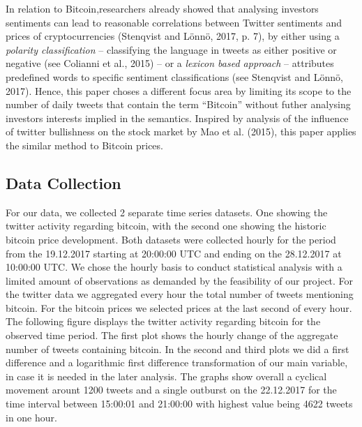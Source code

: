 \documentclass[a4paper,american,12pt]{article}
\begin{document}
\begin{spacing}{1.2}
In relation to Bitcoin,researchers already showed that analysing investors sentiments can lead to reasonable correlations between Twitter sentiments and prices of cryptocurrencies (Stenqvist and Lönnö, 2017, p. 7), by either using a \textit{polarity classification} – classifying the language in tweets as either positive or negative (see Colianni et al., 2015) – or a \textit{lexicon based approach} – attributes predefined words to specific sentiment classifications (see Stenqvist and Lönnö, 2017). Hence, this paper choses a different focus area by limiting its scope to the number of daily tweets that contain the term “Bitcoin” without futher analysing investors interests implied in the semantics. Inspired by analysis of the influence of twitter bullishness on the stock market by Mao et al. (2015), this paper applies the similar method to Bitcoin prices.\\


		
\subsection{Data Collection}
For our data, we collected 2 separate time series datasets. One showing the twitter activity regarding bitcoin, with the second one showing the historic bitcoin price development. Both datasets were collected hourly for the period from the 19.12.2017 starting at 20:00:00 UTC and ending on the 28.12.2017 at 10:00:00 UTC. We chose the hourly basis to conduct statistical analysis with a limited amount of observations as demanded by the feasibility of our project. For the twitter data we aggregated every hour the total number of tweets mentioning bitcoin. For the bitcoin prices we selected prices at the last second of every hour.\\
The following figure displays the twitter activity regarding bitcoin for the observed time period. The first plot shows the hourly change of the aggregate number of tweets containing bitcoin. In the second and third plots we did a first difference and a logarithmic first difference transformation of our main variable, in case it is needed in the later analysis. The graphs show overall a cyclical movement arount 1200 tweets and a single outburst on the 22.12.2017 for the time interval between 15:00:01 and 21:00:00 with highest value being 4622 tweets in one hour.\\


\end{spacing}
\end{document}
